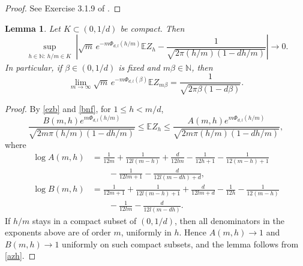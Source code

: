 \documentclass[11pt]{amsart}
\theoremstyle{plain}
\newtheorem{lemma}[theorem]{Lemma}
\numberwithin{equation}{section}
\numberwithin{theorem}{section}
\numberwithin{figure}{section}
\begin{document}
\begin{proof}
See Exercise 3.1.9 of \cite{GS97}.
\end{proof}

\begin{lemma}\label{lem:first-moment-local}
Let $K\subset(0,1/d)$ be compact.  Then
\[
\sup_{\substack{h\in\mathbb{N}:\ h/m\in K}}
\left|
\sqrt{m}\,e^{-m\Phi_{d,l}(h/m)}\mathbb{E}Z_h
-\frac{1}{\sqrt{2\pi(h/m)(1-dh/m)}}
\right|\longrightarrow 0.
\]
In particular, if $\beta\in(0,1/d)$ is fixed and $m\beta\in\mathbb{N}$, then
\[
\lim_{m\to\infty}\sqrt{m}\,e^{-m\Phi_{d,l}(\beta)}\mathbb{E}Z_{m\beta}
=\frac{1}{\sqrt{2\pi\beta(1-d\beta)}}.
\]
\end{lemma}

\begin{proof}
By \eqref{ezb} and \eqref{bnf}, for $1\leq h<m/d$,
\begin{equation}
\frac{B(m,h)e^{m\Phi_{d,l}(h/m)}}
{\sqrt{2m\pi(h/m)(1-dh/m)}}
\leq \mathbb{E}Z_h\leq
\frac{A(m,h)e^{m\Phi_{d,l}(h/m)}}
{\sqrt{2m\pi(h/m)(1-dh/m)}},
\label{azh}
\end{equation}
where
\begin{align*}
\log A(m,h)
&=\frac{1}{12m}+\frac{1}{12l(m-h)}+\frac{d}{12lm}
  -\frac{1}{12h+1}-\frac{1}{12(m-h)+1}\\
&\hspace{2em}
  -\frac{1}{12lm+1}-\frac{d}{12l(m-dh)+d},\\
\log B(m,h)
&=\frac{1}{12m+1}+\frac{1}{12l(m-h)+1}+\frac{d}{12lm+d}
  -\frac{1}{12h}-\frac{1}{12(m-h)}\\
&\hspace{2em}
  -\frac{1}{12lm}-\frac{d}{12l(m-dh)}.
\end{align*}
If $h/m$ stays in a compact subset of $(0,1/d)$, then all denominators in the exponents above are of order $m$, uniformly in $h$.  Hence $A(m,h)\to1$ and $B(m,h)\to1$ uniformly on such compact subsets, and the lemma follows from \eqref{azh}.
\end{proof}
\end{document}
